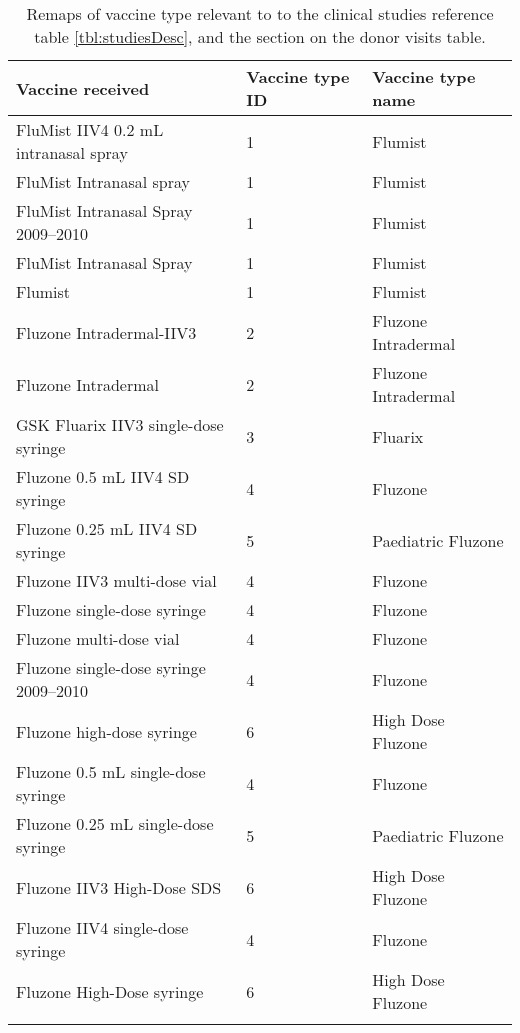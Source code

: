 \begin{appendices}
    \begin{table}[htpb]
        \begin{tabular}{lll}
            \toprule{}
            Vaccine received & Vaccine type ID & Vaccine type name \\
            \midrule{}
            FluMist IIV4 0.2 mL intranasal spray & 1 & Flumist \\
            FluMist Intranasal spray & 1 & Flumist \\
            FluMist Intranasal Spray 2009–2010 & 1 & Flumist \\
            FluMist Intranasal Spray & 1 & Flumist \\
            Flumist & 1 & Flumist \\
            Fluzone Intradermal-IIV3 & 2 & Fluzone Intradermal \\
            Fluzone Intradermal & 2 & Fluzone Intradermal \\
            GSK Fluarix IIV3 single-dose syringe & 3 & Fluarix \\
            Fluzone 0.5 mL IIV4 SD syringe & 4 & Fluzone \\
            Fluzone 0.25 mL IIV4 SD syringe & 5 & Paediatric Fluzone \\
            Fluzone IIV3 multi-dose vial & 4 & Fluzone \\
            Fluzone single-dose syringe & 4 & Fluzone \\
            Fluzone multi-dose vial & 4 & Fluzone \\
            Fluzone single-dose syringe 2009–2010 & 4 & Fluzone \\
            Fluzone high-dose syringe & 6 & High Dose Fluzone \\
            Fluzone 0.5 mL single-dose syringe & 4 & Fluzone \\
            Fluzone 0.25 mL single-dose syringe & 5 & Paediatric Fluzone \\
            Fluzone IIV3 High-Dose SDS & 6 & High Dose Fluzone \\
            Fluzone IIV4 single-dose syringe & 4 & Fluzone \\
            Fluzone High-Dose syringe & 6 & High Dose Fluzone \\
            \bottomrule{}
        \end{tabular}
        \caption{Remaps of vaccine type relevant to to the clinical studies
        reference table \autoref{tbl:studiesDesc}, and the section on the donor
        visits table.}\label{tbl:remapVaccine}
    \end{table}


\end{appendices}
